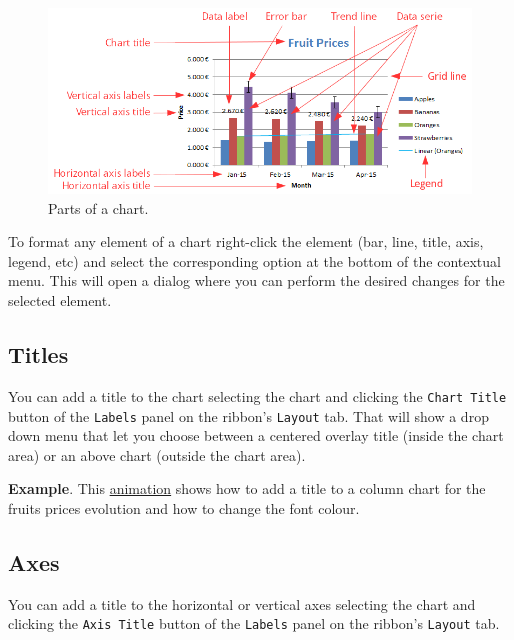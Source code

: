 \begin{figure}[htbp]
\begin{center}
\includegraphics[scale=0.7]{../img/chart_parts.png}
\end{center}
\caption{Parts of a chart.}
\label{img-chart_parts}
\end{figure}

To format any element of a chart right-click the element (bar, line, title, axis, legend, etc) and select the corresponding option at the bottom of the contextual menu. This will open a dialog where you can perform the desired changes for the selected element.

\subsection{Titles}\hypertarget{titles}{}\label{titles}

You can add a title to the chart selecting the chart and clicking the \texttt{Chart Title} button of the \texttt{Labels} panel on the ribbon's \texttt{Layout} tab. That will show a drop down menu that let you choose between a centered overlay title (inside the chart area) or an above chart (outside the chart area).

\textbf{Example}. This \href{http://aprendeconalf.es/office/excel/manual/img/example_chart_title.gif}{animation} shows how to add a title to a column chart for the fruits prices evolution and how to change the font colour.

\subsection{Axes}\hypertarget{axes}{}\label{axes}

You can add a title to the horizontal or vertical axes selecting the chart and clicking the \texttt{Axis Title} button of the \texttt{Labels} panel on the ribbon's \texttt{Layout} tab.

